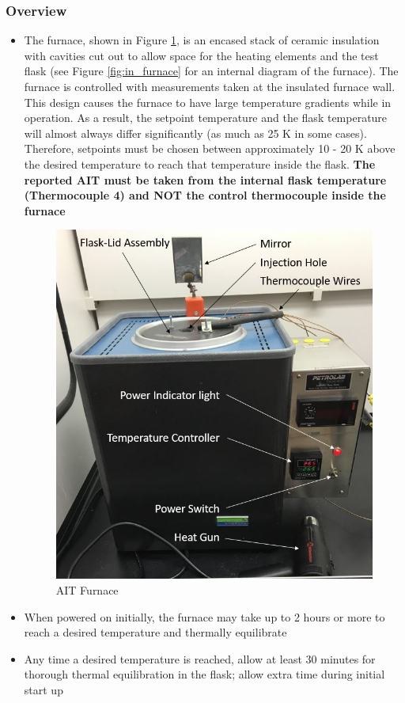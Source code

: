 \documentclass[letterpaper,11pt]{article}
\begin{document}
        \subsubsection{Overview}
    \begin{itemize}
    \item The furnace, shown in Figure \ref{fig:furnace_pic}, is an encased 
        stack of ceramic insulation with cavities 
        cut out to allow space for the heating elements and the test flask
        (see Figure \ref{fig:in_furnace} for an internal diagram of the 
        furnace). The furnace is controlled with measurements taken at the 
        insulated furnace wall. This design causes the furnace to have
        large temperature gradients while in operation. As a result, the 
        setpoint temperature and the flask temperature will almost always 
        differ significantly (as much as 25 K in some cases). Therefore, 
        setpoints must be chosen between approximately 10 - 20 K above the 
        desired temperature to reach that temperature inside the flask.
        \textbf{The reported AIT must be taken from the internal flask 
        temperature (Thermocouple 4) and NOT the control thermocouple inside
        the furnace}
    
    \begin{figure}[H]
    \centering
    \includegraphics[width=.45\textwidth]{Furnace_pic_diagram.jpg}
    \caption{AIT Furnace}
    \label{fig:furnace_pic}
    \end{figure}
    
    \item When powered on initially, the furnace may take up to 2 hours or more  
        to reach a desired temperature and thermally equilibrate
    \item Any time a desired temperature is reached, allow at least 30 
        minutes for thorough thermal equilibration in the flask; allow extra 
        time during initial start up
     
     \end{itemize}
\end{document}
